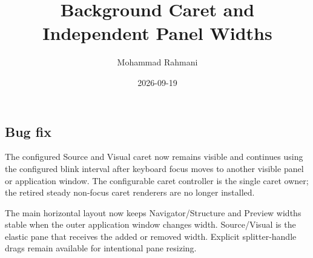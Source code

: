 \documentclass[a4paper]{article}
\title{Background Caret and Independent Panel Widths}
\date{2026-09-19}
\author{Mohammad Rahmani}
\begin{document}
\maketitle
\begin{preview}
\section{Bug fix}
The configured Source and Visual caret now remains visible and continues using
the configured blink interval after keyboard focus moves to another visible
panel or application window.  The configurable caret controller is the single
caret owner; the retired steady non-focus caret renderers are no longer
installed.

The main horizontal layout now keeps Navigator/Structure and Preview widths
stable when the outer application window changes width.  Source/Visual is the
elastic pane that receives the added or removed width.  Explicit splitter-handle
drags remain available for intentional pane resizing.
\end{preview}
\end{document}
